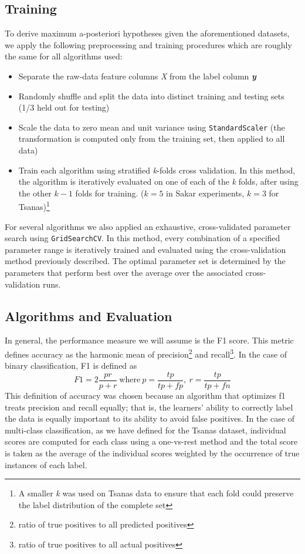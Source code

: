 \documentclass[12pt]{article}
\begin{document}
\subsection{Training}
To derive maximum a-posteriori hypotheses given the aforementioned datasets, we apply the following preprocessing and training procedures which are roughly the same for all algorithms used:
\begin{itemize}
  \item Separate the raw-data feature columns \textit{X} from the label column \textbf{\textit{y}}
  \item Randomly shuffle and split the data into distinct training and testing sets (1/3 held out for testing)
  \item Scale the data to zero mean and unit variance using \texttt{StandardScaler} (the transformation is computed only from the training set, then applied to all data)
  \item Train each algorithm using stratified \textit{k}-folds cross validation. In this method, the algorithm is iteratively evaluated on one of each of the \textit{k} folds, after using the other $k-1$ folds for training. ($k=5$ in Sakar experiments, $k=3$ for Tsanas)\footnote{A smaller \textit{k} was used on Tsanas data to ensure that each fold could preserve the label distribution of the complete set}
\end{itemize}

For several algorithms we also applied an exhaustive, cross-validated parameter search using \texttt{GridSearchCV}. In this method, every combination of a specified parameter range is iteratively trained and evaluated using the cross-validation method previously described. The optimal parameter set is determined by the parameters that perform best over the average over the associated cross-validation runs.

\subsection{Algorithms and Evaluation}
In general, the performance measure we will assume is the F1 score. This metric defines accuracy as the harmonic mean of precision\footnote{ratio of true positives to all predicted positives} and recall\footnote{ratio of true positives to all actual positives}. In the case of binary classification, F1 is defined as
\begin{equation}
F1 = 2\frac{pr}{p+r} \ \textrm{where} \ p = \frac{tp}{tp + fp},\ r = \frac{tp}{tp + fn}
\end{equation}
This definition of accuracy was chosen because an algorithm that optimizes f1 treats precision and recall equally; that is, the learners' ability to correctly label the data is equally important to its ability to avoid false positives. In the case of multi-class classification, as we have defined for the Tsanas dataset, individual scores are computed for each class using a one-vs-rest method and the total score is taken as the average of the individual scores weighted by the occurrence of true instances of each label.
\end{document}
